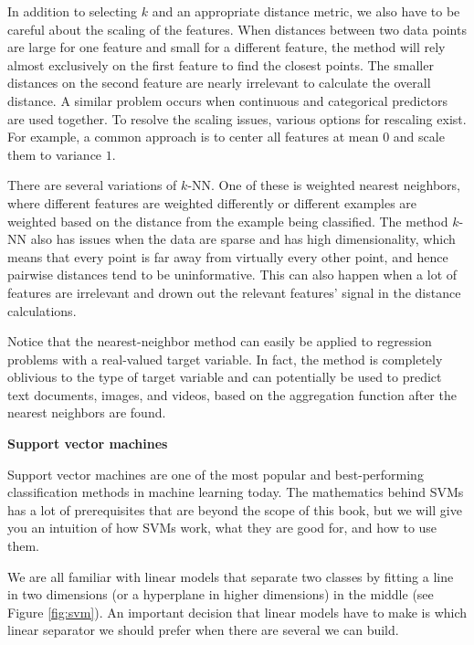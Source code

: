\documentclass[]{krantz}
\begin{document}
In addition to selecting \(k\) and an appropriate distance metric, we
also have to be careful about the scaling of the features. When
distances between two data points are large for one feature and small
for a different feature, the method will rely almost exclusively on the
first feature to find the closest points. The smaller distances on the
second feature are nearly irrelevant to calculate the overall distance.
A similar problem occurs when continuous and categorical predictors are
used together. To resolve the scaling issues, various options for
rescaling exist. For example, a common approach is to center all
features at mean \(0\) and scale them to variance \(1\).

There are several variations of \(k\)-NN. One of these is weighted
nearest neighbors, where different features are weighted differently or
different examples are weighted based on the distance from the example
being classified. The method \(k\)-NN also has issues when the data are
sparse and has high dimensionality, which means that every point is far
away from virtually every other point, and hence pairwise distances tend
to be uninformative. This can also happen when a lot of features are
irrelevant and drown out the relevant features' signal in the distance
calculations.

Notice that the nearest-neighbor method can easily be applied to
regression problems with a real-valued target variable. In fact, the
method is completely oblivious to the type of target variable and can
potentially be used to predict text documents, images, and videos, based
on the aggregation function after the nearest neighbors are found.

\vspace*{-4pt} \textbf{Support vector machines}

Support vector machines are one of the most popular and best-performing
classification methods in machine learning today. The mathematics behind
SVMs has a lot of prerequisites that are beyond the scope of this book,
but we will give you an intuition of how SVMs work, what they are good
for, and how to use them.

We are all familiar with linear models that separate two classes by
fitting a line in two dimensions (or a hyperplane in higher dimensions)
in the middle (see Figure \ref{fig:svm}). An important decision that
linear models have to make is which linear separator we should prefer
when there are several we can build.
\end{document}
